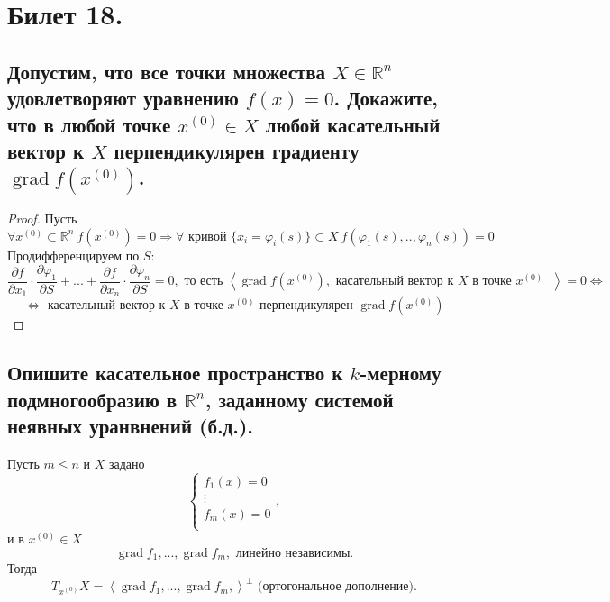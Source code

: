 \section{Билет 18.}

\subsection{Допустим, что все точки множества $X \in \mathbb{R}^n$ удовлетворяют уравнению $f(x) = 0$. Докажите, что в любой точке $x^{(0)} \in X$ любой касательный вектор к $X$ перпендикулярен градиенту $\operatorname{grad} f(x^{(0)})$.}
\begin{proof}
    Пусть
    \[
        \forall x^{(0)} \subset \mathbb{R}^n
        \>
        f(x^{(0)}) = 0
        \Rightarrow
        \forall \text{ кривой }
        \{
            x_i = \varphi_i(s)
        \} \subset X
        \>
        f(\varphi_1(s), .., \varphi_n(s)) = 0
    \]
    Продифференцируем по $S$:
    \[
        \frac{\partial f}{ \partial x_1} \cdot \frac{\partial \varphi_1}{\partial S} +
        ... +
        \frac{\partial f}{ \partial x_n} \cdot \frac{\partial \varphi_n}{\partial S}
        = 0,
        \text{ то есть }
        \left<
            \operatorname{grad} f(x^{(0)}),
            \text{ касательный вектор к $X$ в точке $x^{(0)}$ }
        \right> = 0
        \Leftrightarrow
    \]
    \[
        \Leftrightarrow
        \text{ касательный вектор к $X$ в точке $x^{(0)}$ перпендикулярен }
        \operatorname{grad} f(x^{(0)})
    \]
\end{proof}

\subsection{Опишите касательное пространство к $k$-мерному подмногообразию в $\mathbb{R}^n$, заданному системой неявных уранвнений (б.д.).}
Пусть $m \leqslant n$ и $X$ задано
\[
    \begin{cases}
        f_1(x) = 0 \\
        \vdots \\
        f_m(x) = 0 \\
    \end{cases},
\]
и в $x^{(0)} \in X$
\[
    \operatorname{grad} f_1,
    ...,
    \operatorname{grad} f_m,
    \text{ линейно независимы.}
\]
Тогда
\[
    T_{x^{(0)}} X = \left<
        \operatorname{grad} f_1,
        ...,
        \operatorname{grad} f_m,
    \right>^{\perp}
    \text{ (ортогональное дополнение)}.
\]
